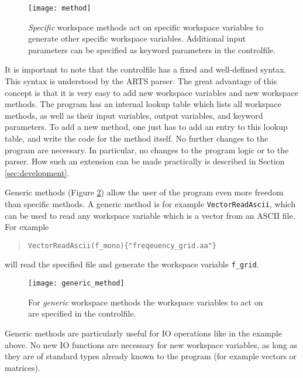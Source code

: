 \begin{figure}
  \begin{center}
    \texttt{[image: method]}
    \caption{\emph{Specific}
        workspace methods act on specific workspace variables to
        generate other specific workspace variables. Additional input
        parameters can be specified as keyword parameters in the
        controlfile.}
    \label{fig:method}
  \end{center}
\end{figure}

It is important to note that the controlfile has a fixed and
well-defined syntax. This syntax is understood by the ARTS parser.
The great advantage of this concept is that it is very easy to add
new workspace variables and new workspace methods. The program has
an internal lookup table which lists all workspace methods, as well
as their input variables, output variables, and keyword
parameters. To add a new method, one just has to add an entry to
this lookup table, and write the code for the method itself. No
further changes to the program are necessary. In particular, no
changes to the program logic or to the parser. How such an extension
can be made practically is described in Section \ref{sec:development}.


\label{sec:concept:generic}

Generic methods (Figure \ref{fig:generic_method}) allow the user of the
program even more freedom than specific methods. A generic method is
for example \verb|VectorReadAscii|, which can be used to read any
workspace variable which is a vector from an ASCII file. For example
\begin{quote}
  \verb|VectorReadAscii(f_mono){"freqeuency_grid.aa"}|
\end{quote}
will read the specified file and generate the workspace variable
\verb|f_grid|.

\begin{figure}
  \begin{center}
    \texttt{[image: generic\_method]}
    \caption{For \emph{generic}
      workspace methods the workspace variables to act on are
        specified in the controlfile.}
    \label{fig:generic_method}
  \end{center}
\end{figure}

Generic methods are particularly useful for IO operations like in the
example above. No new IO functions are necessary for new workspace
variables, as long as they are of standard types already known to the
program (for example vectors or matrices). 

